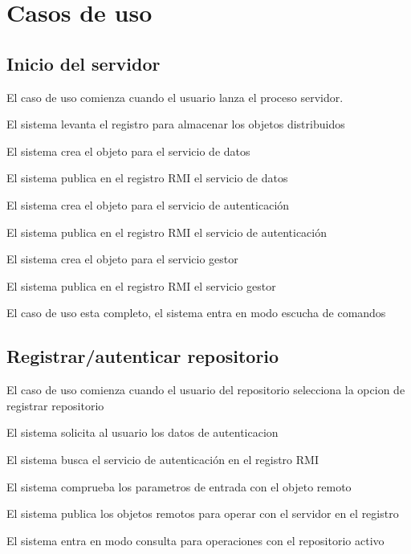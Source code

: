 \chapter{Casos de uso}

\section{Inicio del servidor}

\begin{compactenum}
	\item El caso de uso comienza cuando el usuario lanza el proceso servidor.
	\item El sistema levanta el registro para almacenar los objetos distribuidos
	\item El sistema crea el objeto para el servicio de datos
	\item El sistema publica en el registro RMI el servicio de datos
	\item El sistema crea el objeto para el servicio de autenticación
	\item El sistema publica en el registro RMI el servicio de autenticación
	\item El sistema crea el objeto para el servicio gestor
	\item El sistema publica en el registro RMI el servicio gestor
	\item El caso de uso esta completo, el sistema entra en modo escucha de comandos
\end{compactenum}

\section{Registrar/autenticar repositorio}

\begin{compactenum}
	\item El caso de uso comienza cuando el usuario del repositorio selecciona la opcion de registrar repositorio
	\item El sistema solicita al usuario los datos de autenticacion
	\item El sistema busca el servicio de autenticación en el registro RMI
	\item El sistema comprueba los parametros de entrada con el objeto remoto
	\item El sistema publica los objetos remotos para operar con el servidor en el registro
	\item El sistema entra en modo consulta para operaciones con el repositorio activo
\end{compactenum}

